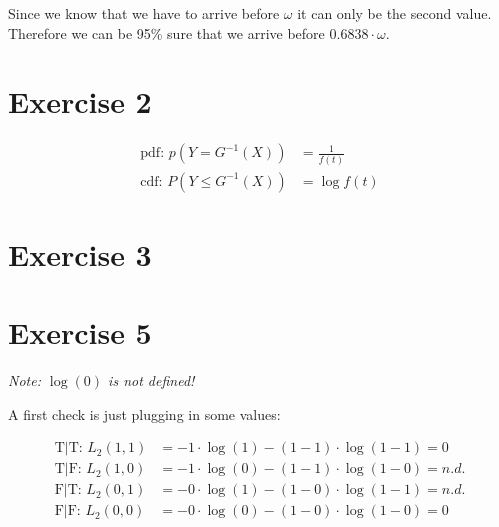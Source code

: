 Since we know that we have to arrive before $\omega$ it can only be the second value. Therefore we can be 95\% sure that we arrive before $0.6838 \cdot \omega$.


\section*{Exercise 2}
\begin{align*}
\mbox{pdf: } p\left(Y   =  G^{-1}\left(X\right)\right) &= \frac{1}{f\left(t\right)} \\
\mbox{cdf: } P\left(Y \leq G^{-1}\left(X\right)\right) &= \log{f\left(t\right)}
\end{align*}


\section*{Exercise 3}



\section*{Exercise 5}
\textit{Note: $\log{\left(0\right)}$ is not defined!}

A first check is just plugging in some values:

\begin{align*}
\mbox{T|T: }L_2(1,1) &= -1 \cdot \log{\left( 1 \right)} - (1 - 1) \cdot \log{\left(1 - 1\right)} = 0    \\
\mbox{T|F: }L_2(1,0) &= -1 \cdot \log{\left( 0 \right)} - (1 - 1) \cdot \log{\left(1 - 0\right)} = n.d. \\
\mbox{F|T: }L_2(0,1) &= -0 \cdot \log{\left( 1 \right)} - (1 - 0) \cdot \log{\left(1 - 1\right)} = n.d. \\
\mbox{F|F: }L_2(0,0) &= -0 \cdot \log{\left( 0 \right)} - (1 - 0) \cdot \log{\left(1 - 0\right)} = 0
\end{align*}



